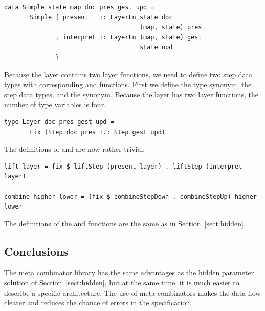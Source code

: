 \documentclass[preprint,natbib]{sigplanconf}
\begin{document}
\begin{small} %
\begin{verbatim}
data Simple state map doc pres gest upd =
       Simple { present   :: LayerFn state doc 
                                     (map, state) pres
              , interpret :: LayerFn (map, state) gest
                                     state upd
              }
\end{verbatim}
\end{small}

Because the layer contains two layer functions, we need to define two step data types with corresponding  and  functions. First we define the  type synonym, the step data types, and the  synonym. Because the layer has two layer functions, the number of type variables is four.

\begin{small} %
\begin{verbatim}
type Layer doc pres gest upd = 
       Fix (Step doc pres :.: Step gest upd)
\end{verbatim}
\end{small}


The definitions of  and  are now rather trivial:

\begin{small}
\begin{verbatim}
lift layer = fix $ liftStep (present layer) . liftStep (interpret layer)

combine higher lower = (fix $ combineStepDown . combineStepUp) higher lower
\end{verbatim}
\end{small}

The definitions of the  and  functions are the same as in Section~\ref{sect:hidden}. 


\subsection{Conclusions} 

The meta combinator library has the same advantages as the hidden parameter solution of Section~\ref{sect:hidden}, but at the same time, it is much easier to describe a specific architecture. The use of meta combinators makes the data flow clearer and reduces the chance of errors in the specification.
\end{document}
